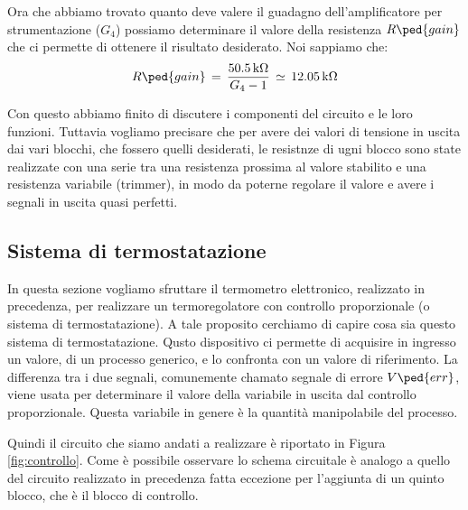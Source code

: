Ora che abbiamo trovato quanto deve valere il guadagno dell'amplificatore per strumentazione ($G_4$) possiamo determinare il valore della resistenza $R\ped{gain}$ che ci permette di ottenere il risultato desiderato. Noi sappiamo che:
\begin{equation}
	R\ped{gain}\,=\,\frac{\SI{50.5}{\kilo\ohm}}{G_4 - 1}\,\simeq\,\SI{12.05}{\kilo\ohm}
	\label{eq:Rgain}
\end{equation}

Con questo abbiamo finito di discutere i componenti del circuito e le loro funzioni. Tuttavia vogliamo precisare che per avere dei valori di tensione in uscita dai vari blocchi, che fossero quelli desiderati, le resistnze di ugni blocco sono state realizzate con una serie tra una resistenza prossima al valore stabilito e una resistenza variabile (trimmer), in modo da poterne regolare il valore e avere i segnali in uscita quasi perfetti.

\subsection*{Sistema di termostatazione}

In questa sezione vogliamo sfruttare il termometro elettronico, realizzato in precedenza, per realizzare un termoregolatore con controllo proporzionale (o sistema di termostatazione). A tale proposito cerchiamo di capire cosa sia questo sistema di termostatazione. Qusto dispositivo ci permette di acquisire in ingresso un valore, di un processo generico, e lo confronta con un valore di riferimento. La differenza tra i due segnali, comunemente chamato segnale di errore $V\ped{err}$, viene usata per determinare il valore della variabile in uscita dal controllo proporzionale. Questa variabile in genere è la quantità manipolabile del processo.

Quindi il circuito che siamo andati a realizzare è riportato in Figura \ref{fig:controllo}. Come è possibile osservare lo schema circuitale è analogo a quello del circuito realizzato in precedenza fatta eccezione per l'aggiunta di un quinto blocco, che è il blocco di controllo.

